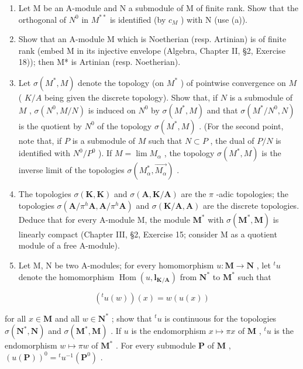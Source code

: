 \begin{enumerate}
\def\labelenumi{(\alph{enumi})}
\setcounter{enumi}{1}
\item
  Let M be an A-module and N a submodule of M of finite rank. Show that the orthogonal of \(N^{0}\) in \(M^{**}\) is identified (by \(c_{M}\) ) with N (use (a)).
\item
  Show that an A-module M which is Noetherian (resp. Artinian) is of finite rank (embed M in its injective envelope (Algebra, Chapter II, §2, Exercise 18)); then M* is Artinian (resp. Noetherian).
\item
  Let \(\sigma(M^{*}, M)\) denote the topology (on \(M^{*}\) ) of pointwise convergence on \(M\) ( \(K/A\) being given the discrete topology). Show that, if \(N\) is a submodule of \(M\) , \(\sigma(N^{0}, M/N)\) is induced on \(N^{0}\) by \(\sigma(M^{*}, M)\) and that \(\sigma(M^{*}/N^{0}, N)\) is the quotient by \(N^{0}\) of the topology \(\sigma(M^{*}, M)\) . (For the second point, note that, if \(P\) is a submodule of \(M\) such that \(N \subset P\) , the dual of \(P/N\) is identified with \(N^{0}/P^{0}\) ). If \(M = \lim M_{\alpha}\) , the topology \(\sigma(M^{*}, M)\) is the inverse limit of the topologies \(\sigma(M_{\alpha}^{*}, \overrightarrow{M_{\alpha}})\) .
\item
  The topologies \(\sigma(\mathbf{K},\mathbf{K})\) and \(\sigma(\mathbf{A},\mathbf{K}/\mathbf{A})\) are the \(\pi\) -adic topologies; the topologies \(\sigma(\mathbf{A}/\pi^{h}\mathbf{A},\mathbf{A}/\pi^{h}\mathbf{A})\) and \(\sigma(\mathbf{K}/\mathbf{A},\mathbf{A})\) are the discrete topologies. Deduce that for every A-module M, the module \(\mathbf{M}^{*}\) with \(\sigma(\mathbf{M}^{*},\mathbf{M})\) is linearly compact (Chapter III, §2, Exercise 15; consider M as a quotient module of a free A-module).
\item
  Let M, N be two A-modules; for every homomorphism \(u: \mathbf{M} \to \mathbf{N}\) , let \(^{t}u\) denote the homomorphism \(\operatorname{Hom}(u, \mathbf{l}_{\mathbf{K/A}})\) from \(\mathbf{N}^{*}\) to \(\mathbf{M}^{*}\) such that
\end{enumerate}

\[
\left(^ {t} u (w)\right) (x) = w (u (x))
\]

for all \(x \in \mathbf{M}\) and all \(w \in \mathbf{N}^*\) ; show that \({}^t u\) is continuous for the topologies \(\sigma(\mathbf{N}^*, \mathbf{N})\) and \(\sigma(\mathbf{M}^*, \mathbf{M})\) . If \(u\) is the endomorphism \(x \mapsto \pi x\) of \(\mathbf{M}\) , \({}^t u\) is the endomorphism \(w \mapsto \pi w\) of \(\mathbf{M}^*\) . For every submodule \(\mathbf{P}\) of \(\mathbf{M}\) , \((u(\mathbf{P}))^0 = {}^t u^{-1}(\mathbf{P}^0)\) .


